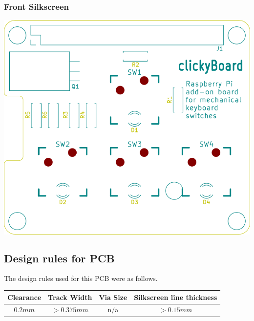 \documentclass[10pt, a4paper, onesided]{article}
\begin{document}
		\subsubsection*{Front Silkscreen}
		\begin{center}
			\includegraphics[width=0.7\linewidth]{img/F_Ss}
		\end{center}
	
\subsection{Design rules for PCB}

	The design rules used for this PCB were as follows.
	
	\begin{tabular}{c|c|c|c}
		Clearance & Track Width & Via Size & Silkscreen line thickness \\ 
		\hline 
		$0.2 mm$ & $> 0.375 mm$ & n/a & $> 0.15 mm$ \\ 
	\end{tabular} 
	
\end{document}
